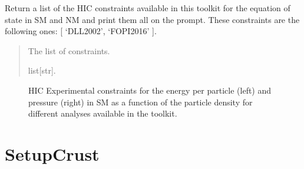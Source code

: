\documentclass[letterpaper,10pt,english]{sphinxmanual}
\begin{document}

\begin{fulllineitems}
\label{\detokenize{source/api/setup_eoshic:nucleardatapy.setup_eoshic.constraints_EOSHIC}}
\pysigstartsignatures
{}
\pysigstopsignatures
\sphinxAtStartPar
Return a list of the HIC constraints available in this toolkit
for the equation of state in SM and NM and print them all on
the prompt. These constraints are the following
ones: {[} ‘DLL\sphinxhyphen{}2002’, ‘FOPI\sphinxhyphen{}2016’ {]}.
\begin{quote}\begin{description}
\sphinxAtStartPar
The list of constraints.

\sphinxAtStartPar
list{[}str{]}.

\end{description}\end{quote}

\end{fulllineitems}


\begin{figure}[htbp]
\centering
\capstart

\noindent{}
\caption{HIC Experimental constraints for the energy per particle (left) and pressure (right) in SM as a function of the particle density for different analyses available in the  toolkit.}\label{\detokenize{source/api/setup_eoshic:id1}}\end{figure}

\sphinxstepscope


\section{SetupCrust}
\label{\detokenize{source/api/setup_crust:setupcrust}}\label{\detokenize{source/api/setup_crust::doc}}\label{\detokenize{source/api/setup_crust:module-nucleardatapy.setup_crust}}
\end{document}
